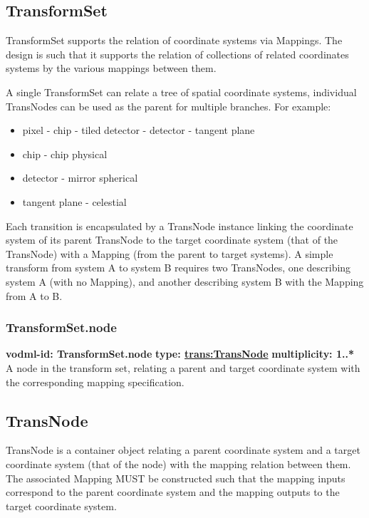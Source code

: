   \subsection{TransformSet}
  \label{sect:TransformSet}
    TransformSet supports the relation of coordinate systems via Mappings. The design is such that it supports the relation of collections of related coordinates systems by the various mappings between them. 

    A single TransformSet can relate a tree of spatial coordinate systems, individual TransNodes can be used as the parent for multiple branches. For example:
    \begin{itemize}
    \item pixel - chip - tiled detector - detector - tangent plane 
    \item chip - chip physical 
    \item detector - mirror spherical 
    \item tangent plane - celestial 
    \end{itemize}

    Each transition is encapsulated by a TransNode instance linking the coordinate system of its parent TransNode to the target coordinate system (that of the TransNode) with a Mapping (from the parent to target systems). A simple transform from system A to system B requires two TransNodes, one describing system A (with no Mapping), and another describing system B with the Mapping from A to B.

    \subsubsection{TransformSet.node}
      \textbf{vodml-id: TransformSet.node} \newline
      \textbf{type: \hyperref[sect:TransNode]{trans:TransNode}} \newline
      \textbf{multiplicity: 1..*} \newline 
      A node in the transform set, relating a parent and target coordinate system with the corresponding mapping specification.

  \subsection{TransNode}
  \label{sect:TransNode}
    TransNode is a container object relating a parent coordinate system and a target coordinate system (that of the node) with the mapping relation between them. The associated Mapping MUST be constructed such that the mapping inputs correspond to the parent coordinate system and the mapping outputs to the target coordinate system. 

